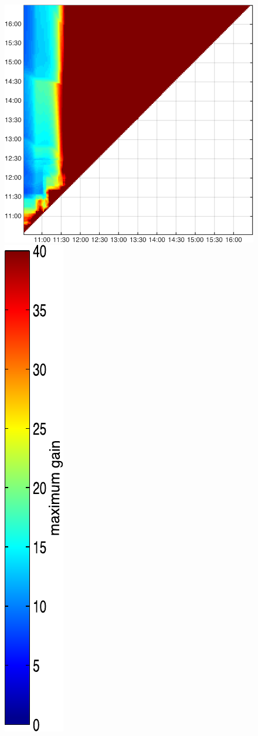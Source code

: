 \begin{figure}
\begin{minipage}[c]{\mylength}
\includegraphics[valign=t,width=\eventswidth]{events/20141022-maxGain-local-events.png}
\includegraphics[valign=t,trim=2pt -8pt 0 5pt,width=\colorbarwidth,totalheight=\eventheight]{events/colorbar-40.pdf}

\end{minipage}
\end{figure}
